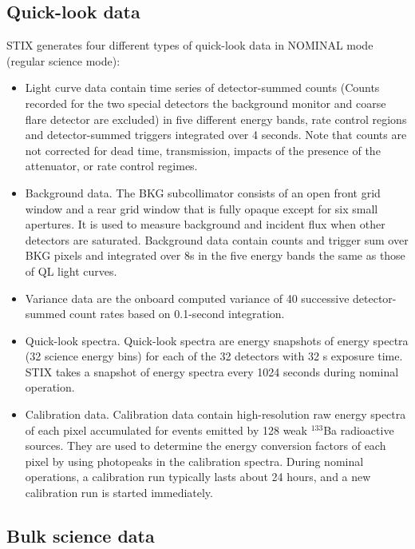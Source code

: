 \documentclass[referee]{aa} %
\begin{document}
\subsection{Quick-look data}
STIX generates four different types of quick-look data in NOMINAL mode (regular science mode):
\begin{itemize}
\item Light curve data contain time series 
of detector-summed counts (Counts recorded for the two 
special detectors  the background monitor and coarse flare detector are excluded) 
in five different energy bands, rate control regions and detector-summed triggers 
integrated over 4 seconds. Note that counts are not corrected for dead time,  transmission, impacts of the presence of the attenuator, 
or rate control regimes.

\item Background data. 
The BKG subcollimator consists of an open front grid window
and a rear grid window that is fully opaque except for six small
apertures. It is used to measure background and incident flux when other detectors are saturated.  
Background data contain counts and trigger sum over BKG pixels and integrated over 8s in the five energy
bands the same as those of QL light curves. 
\item Variance data are the onboard computed variance of 40 successive detector-summed count rates
based on 0.1-second integration.
\item Quick-look spectra. Quick-look spectra 
 are energy snapshots of energy spectra (32 science energy bins) for
each of the 32 detectors with 32 s exposure time.
STIX takes a snapshot of energy spectra every 1024
seconds during nominal operation.
\item Calibration data. 
Calibration data contain high-resolution raw energy spectra of each pixel accumulated for 
events emitted by 128 weak $^{133}$Ba radioactive sources. 
They are used to determine the energy conversion factors of each pixel by using photopeaks in the calibration spectra.  
During nominal operations, a calibration run typically lasts about 24 hours, and a new calibration run is started immediately. 

\end{itemize}


\subsection{Bulk science data}
\end{document}
